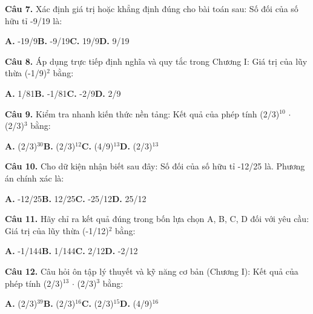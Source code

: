 \documentclass[11pt,a4paper]{article}
\begin{document}
\textbf{\color{primary} Câu 7.} Xác định giá trị hoặc khẳng định đúng cho bài toán sau: Số đối của số hữu tỉ -9/19 là:\par
\hspace*{1.5em}\textbf{A.} -19/9\quad\quad \textbf{B.} -9/19\quad\quad \textbf{C.} 19/9\quad\quad \textbf{D.} 9/19\par\vspace{2pt}
\textbf{\color{primary} Câu 8.} Áp dụng trực tiếp định nghĩa và quy tắc trong Chương I: Giá trị của lũy thừa (-1/9)$^2$ bằng:\par
\hspace*{1.5em}\textbf{A.} 1/81\quad\quad \textbf{B.} -1/81\quad\quad \textbf{C.} -2/9\quad\quad \textbf{D.} 2/9\par\vspace{2pt}
\textbf{\color{primary} Câu 9.} Kiểm tra nhanh kiến thức nền tảng: Kết quả của phép tính (2/3)$^{10}$ $\cdot$ (2/3)$^{3}$ bằng:\par
\hspace*{1.5em}\textbf{A.} (2/3)$^{30}$\quad\quad \textbf{B.} (2/3)$^{12}$\quad\quad \textbf{C.} (4/9)$^{13}$\quad\quad \textbf{D.} (2/3)$^{13}$\par\vspace{2pt}
\textbf{\color{primary} Câu 10.} Cho dữ kiện nhận biết sau đây: Số đối của số hữu tỉ -12/25 là. Phương án chính xác là:\par
\hspace*{1.5em}\textbf{A.} -12/25\quad\quad \textbf{B.} 12/25\quad\quad \textbf{C.} -25/12\quad\quad \textbf{D.} 25/12\par\vspace{2pt}
\textbf{\color{primary} Câu 11.} Hãy chỉ ra kết quả đúng trong bốn lựa chọn A, B, C, D đối với yêu cầu: Giá trị của lũy thừa (-1/12)$^2$ bằng:\par
\hspace*{1.5em}\textbf{A.} -1/144\quad\quad \textbf{B.} 1/144\quad\quad \textbf{C.} 2/12\quad\quad \textbf{D.} -2/12\par\vspace{2pt}
\textbf{\color{primary} Câu 12.} Câu hỏi ôn tập lý thuyết và kỹ năng cơ bản (Chương I): Kết quả của phép tính (2/3)$^{13}$ $\cdot$ (2/3)$^{3}$ bằng:\par
\hspace*{1.5em}\textbf{A.} (2/3)$^{39}$\quad\quad \textbf{B.} (2/3)$^{16}$\quad\quad \textbf{C.} (2/3)$^{15}$\quad\quad \textbf{D.} (4/9)$^{16}$\par\vspace{2pt}
\end{document}
